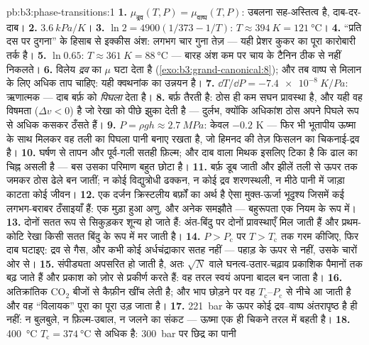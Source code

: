 \begin{solution}{pb:b3:phase-transitions:1}
\textbf{1.} $\mu_{\text{द्रव}}(T, P) = \mu_{\text{वाष्प}}(T,
P)$: उबलना सह-अस्तित्व है, दाब-दर-दाब।
\textbf{2.} $\qty{3.6}{kPa/K}$।
\textbf{3.} $\ln2 = 4900(1/373 - 1/T)$: $T \approx \qty{394}{K} =
\qty{121}{\celsius}$।
\textbf{4.} ``प्रति दस पर दुगना'' के हिसाब से इक्कीस अंश: लगभग चार
गुना तेज़ --- यही प्रेशर कुकर का पूरा कारोबारी तर्क है।
\textbf{5.} $\ln0.65$: $T \approx \qty{361}{K} =
\qty{88}{\celsius}$ --- बारह अंश कम पर चाय के टैनिन ठीक से नहीं
निकलते।
\textbf{6.} विलेय \emph{द्रव} का $\mu$ घटा देता है
(\cref{exo:b3:grand-canonical:8}); और तब वाष्प से मिलान के लिए
अधिक ताप चाहिए: यही क्वथनांक का उन्नयन है।
\textbf{7.} $\dd T/\dd P = \qty{-7.4e-8}{K/Pa}$: ऋणात्मक ---
दाब बर्फ़ को \emph{पिघला} देता है।
\textbf{8.} बर्फ़ तैरती है: ठोस ही कम सघन प्रावस्था है, और यही वह
विषमता ($\Delta v < 0$) है जो रेखा को पीछे झुका देती है ---
दुर्लभ, क्योंकि अधिकांश ठोस अपने पिघले रूप से अधिक कसकर ठँसते हैं।
\textbf{9.} $P = \rho gh \approx \qty{2.7}{MPa}$: केवल
$-0.2$ K --- फिर भी भूतापीय ऊष्मा के साथ मिलकर वह तली का पिघला
पानी बनाए रखता है, जो हिमनद की तेज़ फिसलन का चिकनाई-द्रव है।
\textbf{10.} घर्षण से तापन और पूर्व-गली सतही फ़िल्म; और दाब वाला
मिथक इसलिए टिका है कि ढाल का चिह्न असली है --- बस उसका परिमाण
बहुत छोटा है।
\textbf{11.} बर्फ़ डूब जाती और झीलें तली से ऊपर तक जमकर ठोस ढेले
बन जातीं; न कोई विद्युत्रोधी ढक्कन, न कोई द्रव शरणस्थली, न
मीठे पानी में जाड़ा काटता कोई जीवन।
\textbf{12.} एक दर्जन क्रिस्टलीय बर्फ़ों का अर्थ है ऐसा
मुक्त-ऊर्जा भूदृश्य जिसमें कई लगभग-बराबर ठँसाइयाँ हैं: एक मुड़ा
हुआ अणु, और अनेक समझौते --- बहुरूपता एक नियम के रूप में।
\textbf{13.} दोनों सतत रूप से सिकुड़कर शून्य हो जाते हैं:
अंत-बिंदु पर दोनों प्रावस्थाएँ मिल जाती हैं और प्रथम-कोटि रेखा
किसी सतत बिंदु के रूप में मर जाती है।
\textbf{14.} $P > P_{\text{c}}$ पर $T > T_{\text{c}}$ तक गरम
कीजिए, फिर दाब घटाइए: द्रव से गैस, और कभी कोई अर्धचंद्राकार सतह
नहीं --- पहाड़ के ऊपर से नहीं, उसके चारों ओर से।
\textbf{15.} संपीड्यता अपसरित हो जाती है, अतः $\sqrt N$ वाले
घनत्व-उतार-चढ़ाव प्रकाशिक पैमानों तक बढ़ जाते हैं और प्रकाश को
ज़ोर से प्रकीर्ण करते हैं: वह तरल स्वयं अपना बादल बन जाता है।
\textbf{16.} अतिक्रांतिक CO$_2$ बीजों से कैफ़ीन खींच लेती है; और
भाप छोड़ने पर वह $T_{\text{c}}$--$P_{\text{c}}$ से नीचे आ जाती है
और वह ``विलायक'' पूरा का पूरा उड़ जाता है।
\textbf{17.} \qty{221}{bar} के ऊपर कोई द्रव--वाष्प अंतरापृष्ठ है
ही नहीं: न बुलबुले, न फ़िल्म-उबाल, न जलने का संकट --- ऊष्मा एक ही
चिकने तरल में बहती है।
\textbf{18.} \qty{400}{\celsius} $T_{\text{c}} =
\qty{374}{\celsius}$ से अधिक है: \qty{300}{bar} पर छिद्र का पानी

\end{solution}
